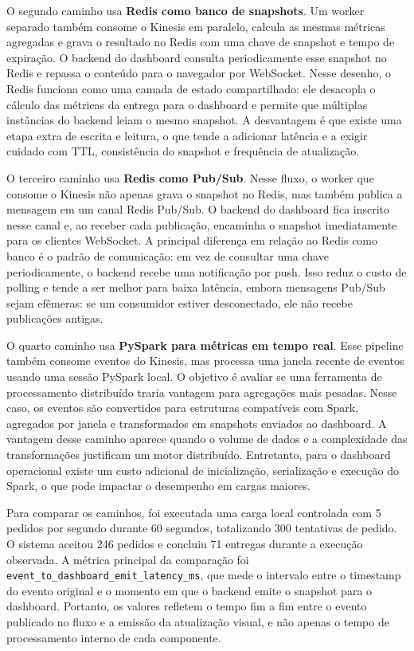﻿\documentclass{article}
\begin{document}
O segundo caminho usa \textbf{Redis como banco de snapshots}. Um worker separado também consome o Kinesis em paralelo, calcula as mesmas métricas agregadas e grava o resultado no Redis com uma chave de snapshot e tempo de expiração. O backend do dashboard consulta periodicamente esse snapshot no Redis e repassa o conteúdo para o navegador por WebSocket. Nesse desenho, o Redis funciona como uma camada de estado compartilhado: ele desacopla o cálculo das métricas da entrega para o dashboard e permite que múltiplas instâncias do backend leiam o mesmo snapshot. A desvantagem é que existe uma etapa extra de escrita e leitura, o que tende a adicionar latência e a exigir cuidado com TTL, consistência do snapshot e frequência de atualização.

O terceiro caminho usa \textbf{Redis como Pub/Sub}. Nesse fluxo, o worker que consome o Kinesis não apenas grava o snapshot no Redis, mas também publica a mensagem em um canal Redis Pub/Sub. O backend do dashboard fica inscrito nesse canal e, ao receber cada publicação, encaminha o snapshot imediatamente para os clientes WebSocket. A principal diferença em relação ao Redis como banco é o padrão de comunicação: em vez de consultar uma chave periodicamente, o backend recebe uma notificação por push. Isso reduz o custo de polling e tende a ser melhor para baixa latência, embora mensagens Pub/Sub sejam efêmeras: se um consumidor estiver desconectado, ele não recebe publicações antigas.

O quarto caminho usa \textbf{PySpark para métricas em tempo real}. Esse pipeline também consome eventos do Kinesis, mas processa uma janela recente de eventos usando uma sessão PySpark local. O objetivo é avaliar se uma ferramenta de processamento distribuído traria vantagem para agregações mais pesadas. Nesse caso, os eventos são convertidos para estruturas compatíveis com Spark, agregados por janela e transformados em snapshots enviados ao dashboard. A vantagem desse caminho aparece quando o volume de dados e a complexidade das transformações justificam um motor distribuído. Entretanto, para o dashboard operacional existe um custo adicional de inicialização, serialização e execução do Spark, o que pode impactar o desempenho em cargas maiores.

Para comparar os caminhos, foi executada uma carga local controlada com 5 pedidos por segundo durante 60 segundos, totalizando 300 tentativas de pedido. O sistema aceitou 246 pedidos e concluiu 71 entregas durante a execução observada. A métrica principal da comparação foi \texttt{event\_to\_dashboard\_emit\_latency\_ms}, que mede o intervalo entre o timestamp do evento original e o momento em que o backend emite o snapshot para o dashboard. Portanto, os valores refletem o tempo fim a fim entre o evento publicado no fluxo e a emissão da atualização visual, e não apenas o tempo de processamento interno de cada componente.
\end{document}
